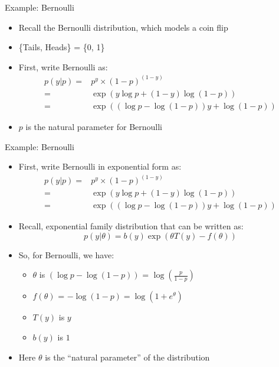 \documentclass[aspectratio=169]{beamer}
\begin{document}
\begin{frame}{Example: Bernoulli}

\begin{itemize}
\item Recall the Bernoulli distribution, which models a coin flip
\item \{Tails, Heads\} = \{0, 1\}
\item First, write Bernoulli as:
\begin{align}
p (y | p) = &p^y \times (1 - p)^{(1 - y)} \nonumber \\
	= &\exp (y \log p + (1 - y) \log (1 - p)) \nonumber \\
	= &\exp ((\log p - \log (1 - p)) y + \log (1 - p)) \nonumber
\end{align}
\item $p$ is the natural parameter for Bernoulli
\end{itemize}
\end{frame}
\begin{frame}{Example: Bernoulli}

\begin{itemize}
\item First, write Bernoulli in exponential form as:
\begin{align}
p (y | p) = &p^y \times (1 - p)^{(1 - y)} \nonumber \\
	= &\exp (y \log p + (1 - y) \log (1 - p)) \nonumber \\
	= &\exp ((\log p - \log (1 - p)) y + \log (1 - p)) \nonumber
\end{align}
\item Recall, exponential family distribution that can be written as:
$$p (y | \theta) = b (y) \exp (\theta T(y) - f (\theta))$$
\item So, for Bernoulli, we have:
	\begin{itemize}
	\item $\theta$ is $(\log p - \log (1 - p))$ = $\log (\frac{p}{1 - p})$
	\item $f(\theta)$ = $-\log (1 - p) = \log (1 + e^\theta)$ 
	\item $T (y)$ is $y$
	\item $b (y)$ is $1$ %
	\end{itemize}
\item Here $\theta$ is the ``natural parameter'' of the distribution
\end{itemize}
\end{frame} %
\end{document}
